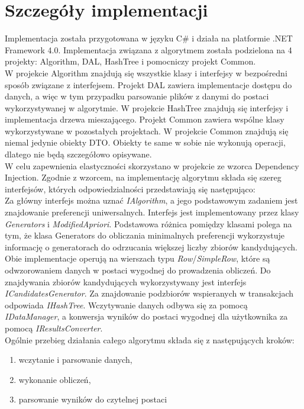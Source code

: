 \documentclass[a4paper,12pt]{article}
\begin{document}
\section{Szczegóły implementacji}

Implementacja została przygotowana w języku C\# i działa na platformie .NET Framework 4.0. Implementacja związana z algorytmem została podzielona na 4 projekty: Algorithm, DAL, HashTree i pomocniczy projekt Common.\\

W projekcie Algorithm znajdują się wszystkie klasy i interfejsy w bezpośredni sposób związane z interfejsem. Projekt DAL zawiera implementacje dostępu do danych, a więc w tym przypadku parsowanie plików z danymi do postaci wykorzystywanej w algorytmie. W projekcie HashTree znajdują się interfejsy i implementacja drzewa mieszającego. Projekt Common zawiera wspólne klasy wykorzystywane w pozostałych projektach. W projekcie Common znajdują się niemal jedynie obiekty DTO. Obiekty te same w sobie nie wykonują operacji, dlatego nie będą szczegółowo opisywane.\\

W celu zapewnienia elastyczności skorzystano w projekcie ze wzorca Dependency Injection. Zgodnie z wzorcem, na implementację algorytmu składa się szereg interfejsów, których odpowiedzialności przedstawiają się następująco:\\

Za główny interfejs można uznać \textit{IAlgorithm}, a jego podstawowym zadaniem jest znajdowanie preferencji uniwersalnych. Interfejs jest implementowany przez klasy \textit{Generators} i \textit{ModifiedApriori}. Podstawowa różnica pomiędzy klasami polega na tym, że klasa Generators do obliczania minimalnych preferencji wykorzystuje informację o generatorach do odrzucania większej liczby zbiorów kandydujących. Obie implementacje operują na wierszach
typu \textit{Row}/\textit{SimpleRow}, które są odwzorowaniem danych w postaci wygodnej do prowadzenia obliczeń. Do znajdywania zbiorów kandydujących wykorzystywany jest interfejs \textit{ICandidatesGenerator}. Za znajdowanie podzbiorów wspieranych w transakcjach odpowiada \textit{IHashTree}. Wczytywanie danych odbywa się za pomocą \textit{IDataManager}, a konwersja wyników do postaci wygodnej dla użytkownika za pomocą \textit{IResultsConverter}.\\

Ogólnie przebieg działania całego algorytmu składa się z następujących kroków:

\begin{enumerate}
\item wczytanie i parsowanie danych,
\item wykonanie obliczeń,
\item parsowanie wyników do czytelnej postaci
\end{enumerate}
\end{document}
